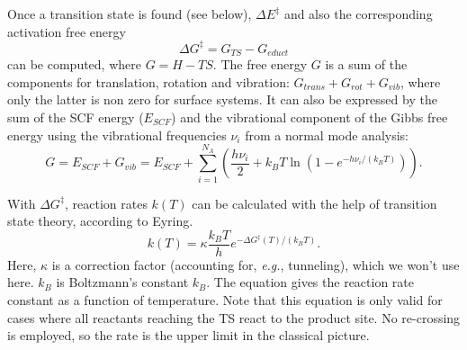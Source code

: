 \documentclass[11pt,DIV=13,BCOR=5mm,a4paper,headinclude]{scrbook}
\begin{document}
Once a transition state is found (see below), $\Delta E^\ddagger$ and also the corresponding activation free energy
\begin{equation}
\Delta G^\ddagger = G_{TS} - G_{educt}
\end{equation}
can be computed, where $G=H-TS$. %
The free energy $G$ is a sum of the components for translation, rotation and vibration: $G_{trans}+G_{rot}+G_{vib}$, where only the latter is non zero for surface systems.
It can also be expressed by the sum of the SCF energy ($E_{SCF}$) and the vibrational component of the Gibbs free energy using the vibrational frequencies $\nu_i$ from a normal mode analysis:
\begin{equation}
G=E_{SCF} + G_{vib}=E_{SCF}+ \sum_{i=1}^{N_A}(\frac{h\nu_i}{2} + k_BT\ln(1-e^{-h\nu_i/(k_BT)})).
\end{equation}

With $\Delta G^\ddagger$, reaction rates $k(T)$ can be calculated with the help of transition state theory, according to Eyring\cite{eyring,eyring-polanyi}.
\begin{equation}\label{eq:eyring}
k(T)=\kappa\frac{k_BT}{h}e^{-\Delta G^\ddagger(T)/(k_BT)}.
\end{equation}
Here, $\kappa$ is a correction factor (accounting for, \textit{e.g.}, tunneling), which we won't use here. $k_B$ is Boltzmann's constant $k_B$.
The equation gives the reaction rate constant as a function of temperature.
Note that this equation is only valid for cases where all reactants reaching the TS react to the product site.
No re-crossing is employed, so the rate is the upper limit in the classical picture.
\\\\
\end{document}
